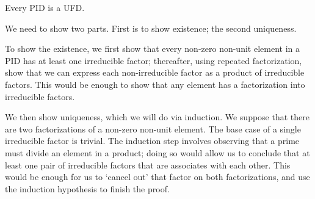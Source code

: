 \begin{theorem}\label{thrm-PID-is-UFD}
    Every PID is a UFD.
\end{theorem}
\begin{proofsketch}
    We need to show two parts. First is to show existence; the second uniqueness.

    To show the existence, we first show that every non-zero non-unit element in a PID has at least one irreducible factor; thereafter, using repeated factorization, show that we can express each non-irreducible factor as a product of irreducible factors. This would be enough to show that any element has a factorization into irreducible factors.

    We then show uniqueness, which we will do via induction. We suppose that there are two factorizations of a non-zero non-unit element. The base case of a single irreducible factor is trivial. The induction step involves observing that a prime must divide an element in a product; doing so would allow us to conclude that at least one pair of irreducible factors that are associates with each other. This would be enough for us to `cancel out' that factor on both factorizations, and use the induction hypothesis to finish the proof.
\end{proofsketch}
